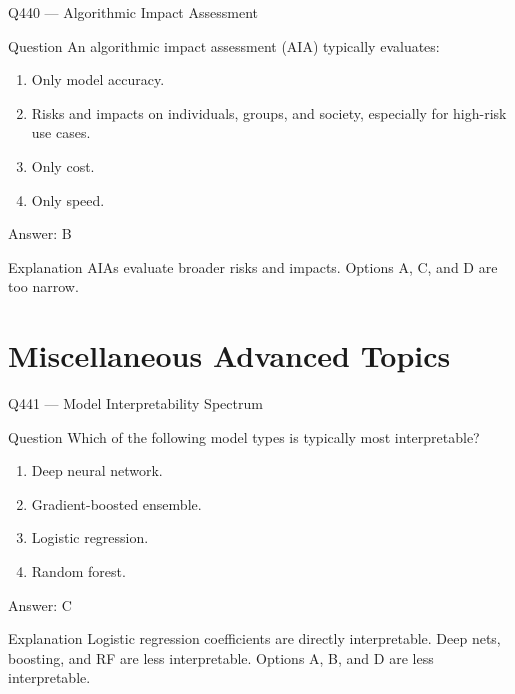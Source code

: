 \documentclass[aspectratio=169,8pt]{beamer}
\begin{document}
	\begin{frame}{Q440 --- Algorithmic Impact Assessment}
		\begin{block}{Question}
			An algorithmic impact assessment (AIA) typically evaluates:
			\begin{enumerate}
				\item Only model accuracy.
				\item Risks and impacts on individuals, groups, and society, especially for high-risk use cases.
				\item Only cost.
				\item Only speed.
			\end{enumerate}
		\end{block}
		\begin{exampleblock}{Answer: B}\end{exampleblock}
		\begin{block}{Explanation}
			AIAs evaluate broader risks and impacts. Options A, C, and D are too narrow.
		\end{block}
	\end{frame}
	
	\section{Miscellaneous Advanced Topics}
	
	\begin{frame}{Q441 --- Model Interpretability Spectrum}
		\begin{block}{Question}
			Which of the following model types is typically most interpretable?
			\begin{enumerate}
				\item Deep neural network.
				\item Gradient-boosted ensemble.
				\item Logistic regression.
				\item Random forest.
			\end{enumerate}
		\end{block}
		\begin{exampleblock}{Answer: C}\end{exampleblock}
		\begin{block}{Explanation}
			Logistic regression coefficients are directly interpretable. Deep nets, boosting, and RF are less interpretable. Options A, B, and D are less interpretable.
		\end{block}
	\end{frame}
	
\end{document}
